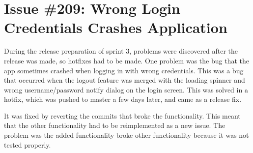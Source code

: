 \section{Issue \#209: Wrong Login Credentials Crashes Application}
During the release preparation of sprint 3, problems were discovered after the release was made, so hotfixes had to be made. One problem was the bug that the app sometimes crashed when logging in with wrong credentials. This was a bug that occurred when the logout feature was merged with the loading spinner and wrong username/password notify dialog on the login screen. This was solved in a hotfix, which was pushed to master a few days later, and came as a release fix.

It was fixed by reverting the commits that broke the functionality. This meant that the other functionality had to be reimplemented as a new issue.
The problem was the added functionality broke other functionality because it was not tested properly.  